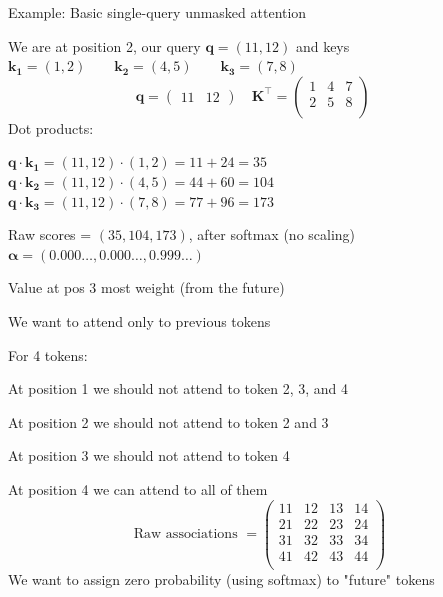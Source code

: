 \documentclass[12pt,aspectratio=169,handout]{beamer}
\begin{document}
\begin{frame}{Example: Basic single-query unmasked attention}

We are at position 2, our query $\bm{q} = (11, 12)$ and keys
$\bm{k_1} = (1, 2) \qquad \bm{k_2} = (4, 5) \qquad \bm{k_3} = (7, 8)$
$$
\bm{q} = \begin{pmatrix}
	11 & 12
\end{pmatrix}
\quad
\bm{K}^\top =
\begin{pmatrix}
1 & 4 & 7 \\
2 & 5 & 8 \\
\end{pmatrix}
\quad
$$
Dot products:

$\bm{q} \cdot \bm{k_1} = (11, 12) \cdot (1, 2) = 11 + 24 = 35$
$\bm{q} \cdot \bm{k_2} = (11, 12) \cdot (4, 5) = 44 + 60 = 104$
$\bm{q} \cdot \bm{k_3} = (11, 12) \cdot (7, 8) = 77 + 96 = 173$

Raw scores = $(35, 104, 173)$, after softmax (no scaling) $\bm{\alpha} = (0.000\ldots, 0.000\ldots, 0.999\ldots)$

Value at pos 3 most weight (from the future)



\end{frame}


\begin{frame}{We want to attend only to previous tokens}
	
For 4 tokens:

At position 1 we should not attend to token 2, 3, and 4

At position 2 we should not attend to token 2 and 3

At position 3 we should not attend to token 4

At position 4 we can attend to all of them
$$
\text{Raw associations } =
\begin{pmatrix}
11 & 12 & 13 & 14 \\
21 & 22 & 23 & 24 \\
31 & 32 & 33 & 34 \\
41 & 42 & 43 & 44 \\
\end{pmatrix}
$$
We want to assign zero probability (using softmax) to "future" tokens
\end{frame}
\end{document}
